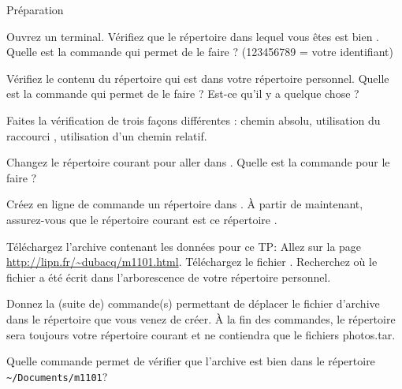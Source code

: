  
  
  
  
   

\begin{exercice}
  \begin{exercicelet}{Préparation}
    \begin{questions}
    \item Ouvrez un terminal. Vérifiez que le répertoire dans lequel
      vous êtes est bien . Quelle est la
      commande qui permet de le faire ? (123456789 = votre identifiant)
    \item Vérifiez le contenu du répertoire  qui est dans
      votre répertoire personnel. Quelle est la commande qui permet de
      le faire ? Est-ce qu'il y a quelque chose ?
    \item Faites la vérification de trois façons différentes : chemin
      absolu, utilisation du raccourci \lin{\~}, utilisation d'un chemin
      relatif.
    \item Changez le répertoire courant pour aller dans
      . Quelle est la commande pour le faire ?
    \item Créez en ligne de commande un répertoire  dans
      . À partir de maintenant, assurez-vous que le
      répertoire courant est ce répertoire .
    \item Téléchargez l'archive contenant les données pour ce TP:
      Allez sur la page
      \url{http://lipn.fr/~dubacq/m1101.html}.
      Téléchargez le fichier . Recherchez où
      le fichier a été écrit dans l'arborescence de votre répertoire
      personnel.
    \item Donnez la (suite de) commande(s) permettant de déplacer le
      fichier d'archive dans le répertoire  que vous venez de
      créer. À la fin des commandes, le répertoire  sera
      toujours votre répertoire courant et ne contiendra que le fichiers
      photos.tar.
    \item Quelle commande permet de vérifier que l'archive est bien dans
      le répertoire \verb|~/Documents/m1101|?
    \end{questions}
  \end{exercicelet}
\end{exercice}
